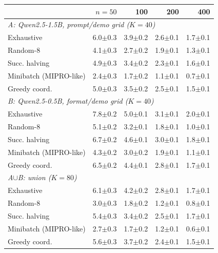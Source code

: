 \begin{tabular}{lrrrr}\toprule
 & $n{=}50$ & 100 & 200 & 400 \\\midrule
\multicolumn{5}{l}{\emph{A: Qwen2.5-1.5B, prompt/demo grid ($K{=}40$)}} \\
Exhaustive & 6.0$\pm$0.3 & 3.9$\pm$0.2 & 2.6$\pm$0.1 & 1.7$\pm$0.1 \\
Random-8 & 4.1$\pm$0.3 & 2.7$\pm$0.2 & 1.9$\pm$0.1 & 1.3$\pm$0.1 \\
Succ. halving & 4.9$\pm$0.3 & 3.4$\pm$0.2 & 2.3$\pm$0.1 & 1.6$\pm$0.1 \\
Minibatch (MIPRO-like) & 2.4$\pm$0.3 & 1.7$\pm$0.2 & 1.1$\pm$0.1 & 0.7$\pm$0.1 \\
Greedy coord. & 5.0$\pm$0.3 & 3.5$\pm$0.2 & 2.5$\pm$0.1 & 1.5$\pm$0.1 \\
\multicolumn{5}{l}{\emph{B: Qwen2.5-0.5B, format/demo grid ($K{=}40$)}} \\
Exhaustive & 7.8$\pm$0.2 & 5.0$\pm$0.1 & 3.1$\pm$0.1 & 2.0$\pm$0.1 \\
Random-8 & 5.1$\pm$0.2 & 3.2$\pm$0.1 & 1.8$\pm$0.1 & 1.0$\pm$0.1 \\
Succ. halving & 6.7$\pm$0.2 & 4.6$\pm$0.1 & 3.0$\pm$0.1 & 1.8$\pm$0.1 \\
Minibatch (MIPRO-like) & 4.3$\pm$0.2 & 3.0$\pm$0.2 & 1.9$\pm$0.1 & 1.1$\pm$0.1 \\
Greedy coord. & 6.5$\pm$0.2 & 4.4$\pm$0.1 & 2.8$\pm$0.1 & 1.7$\pm$0.1 \\
\multicolumn{5}{l}{\emph{A$\cup$B: union ($K{=}80$)}} \\
Exhaustive & 6.1$\pm$0.3 & 4.2$\pm$0.2 & 2.8$\pm$0.1 & 1.7$\pm$0.1 \\
Random-8 & 3.0$\pm$0.3 & 1.8$\pm$0.2 & 1.2$\pm$0.1 & 0.8$\pm$0.1 \\
Succ. halving & 5.4$\pm$0.3 & 3.4$\pm$0.2 & 2.5$\pm$0.1 & 1.7$\pm$0.1 \\
Minibatch (MIPRO-like) & 2.7$\pm$0.3 & 1.7$\pm$0.2 & 1.2$\pm$0.1 & 0.6$\pm$0.1 \\
Greedy coord. & 5.6$\pm$0.3 & 3.7$\pm$0.2 & 2.4$\pm$0.1 & 1.5$\pm$0.1 \\
\bottomrule
\end{tabular}

